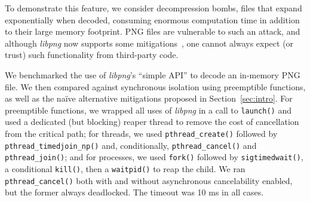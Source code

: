 To demonstrate this feature, we consider
decompression bombs, files that expand exponentially when decoded, consuming enormous
computation time in addition to their large memory footprint.
PNG files are vulnerable to such an attack, and although \textit{libpng} now
supports some mitigations~\cite{www-libpng-bombs}, one cannot always expect (or
trust) such functionality from third-party code.

We benchmarked the use of \textit{libpng}'s ``simple API'' to decode an in-memory PNG
file.  We then compared against synchronous isolation using preemptible functions, as
well as the na\"ive alternative mitigations proposed in Section~\ref{sec:intro}.  For
preemptible functions, we wrapped all uses of \textit{libpng} in a call to
\texttt{launch()} and used a dedicated (but blocking) reaper thread to remove the
cost of cancellation from the critical path; for threads, we used
\texttt{pthread\_create()} followed by \texttt{pthread\_timedjoin\_np()} and,
conditionally, \texttt{pthread\_cancel()} and \texttt{pthread\_join()}; and for
processes, we used \texttt{fork()} followed by \texttt{sigtimedwait()}, a
conditional \texttt{kill()}, then a \texttt{waitpid()} to reap the child.  We ran
\texttt{pthread\_cancel()} both with and without asynchronous cancelability enabled,
but the former always deadlocked.  The timeout was 10 ms in all cases.

